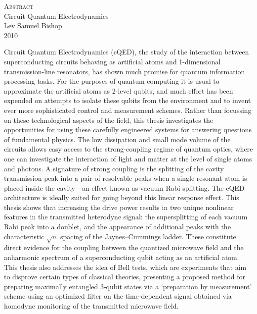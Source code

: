 %
\thispagestyle{empty}
\begin{singlespace}\begin{center}
{\textsc{Abstract}}\\[0.5cm]
{\Large Circuit Quantum Electrodynamics}\\
{\large Lev Samuel Bishop}\\
2010\\
\end{center}\end{singlespace}
\vfill
\noindent
Circuit Quantum Electrodynamics (cQED), the study of the interaction between superconducting circuits behaving as artificial atoms and 1-dimensional transmission-line resonators, has shown much promise for quantum information processing tasks. For the purposes of quantum computing it is usual to approximate the artificial atoms as 2-level qubits, and much effort has been expended on attempts to isolate these qubits from the environment and to invent ever more sophisticated control and measurement schemes. Rather than focussing on these technological aspects of the field, this thesis investigates the opportunities for using these carefully engineered systems for answering questions of fundamental physics. The low dissipation and small mode volume of the circuits allows easy access to the strong-coupling regime of quantum optics, where one can investigate the interaction of light and matter at the level of single atoms and photons. A signature of strong coupling is the splitting of the cavity transmission peak into a pair of resolvable peaks when a single resonant atom is placed inside the cavity---an effect known as vacuum Rabi splitting. The cQED architecture is ideally suited for going beyond this linear response effect. This thesis shows that increasing the drive power results in two unique nonlinear features in the transmitted heterodyne signal: the supersplitting of each vacuum Rabi peak into a doublet, and the appearance of additional peaks with the characteristic $\sqrt{n}$ spacing of the Jaynes--Cummings ladder. These constitute direct evidence for the coupling between the quantized microwave field and the anharmonic spectrum of a superconducting qubit acting as an artificial atom. This thesis also addresses the idea of Bell tests, which are experiments that aim to disprove certain types of classical theories, presenting a proposed method for preparing maximally entangled 3-qubit states via a `preparation by measurement' scheme using an optimized filter on the time-dependent signal obtained via homodyne monitoring of the transmitted microwave field. 
